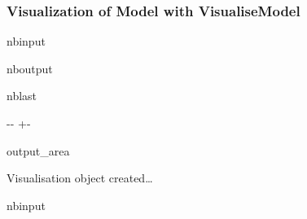 \documentclass[a4paper,11pt,english,openany]{sphinxmanual}
\begin{document}
\subsubsection{Visualization of Model with VisualiseModel}
\label{\detokenize{quick_start/example/main_original:Visualization-of-Model-with-VisualiseModel}}
\begin{sphinxuseclass}{nbinput}
{
\begin{sphinxVerbatim}[commandchars=\\\{\}]
\llap{\color{nbsphinxin}[4]:\,\hspace{\fboxrule}\hspace{\fboxsep}}  
\end{sphinxVerbatim}
}

\end{sphinxuseclass}
\begin{sphinxuseclass}{nboutput}
\begin{sphinxuseclass}{nblast}
{

\kern-\sphinxverbatimsmallskipamount\kern-\baselineskip
\kern+\FrameHeightAdjust\kern-\fboxrule
\vspace{\nbsphinxcodecellspacing}

\begin{sphinxuseclass}{output_area}
\begin{sphinxuseclass}{}


\begin{sphinxVerbatim}[commandchars=\\\{\}]
Visualisation object created{\ldots}
\end{sphinxVerbatim}



\end{sphinxuseclass}
\end{sphinxuseclass}
}

\end{sphinxuseclass}
\end{sphinxuseclass}
\begin{sphinxuseclass}{nbinput}
{
\begin{sphinxVerbatim}[commandchars=\\\{\}]
\llap{\color{nbsphinxin}[5]:\,\hspace{\fboxrule}\hspace{\fboxsep}}
  

\end{sphinxVerbatim}
}

\end{sphinxuseclass}
\end{document}
